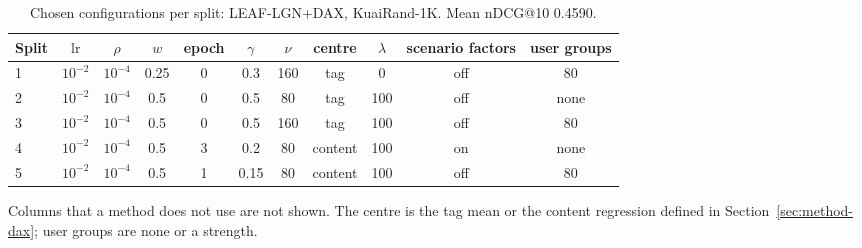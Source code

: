 \begin{table}[tbp]
\centering
\footnotesize
\caption{Chosen configurations per split: LEAF-LGN+DAX, KuaiRand-1K. Mean nDCG@10 0.4590.}
\label{tab:grid12}
\begin{adjustbox}{max width=\linewidth}
\begin{tabular}{lcccccccccc}
\toprule
Split & $\mathrm{lr}$ & $\rho$ & $w$ & epoch & $\gamma$ & $\nu$ & centre & $\lambda$ & scenario factors & user groups \\
\midrule
1 & $10^{-2}$ & $10^{-4}$ & 0.25 & 0 & 0.3 & 160 & tag & 0 & off & 80 \\
2 & $10^{-2}$ & $10^{-4}$ & 0.5 & 0 & 0.5 & 80 & tag & 100 & off & none \\
3 & $10^{-2}$ & $10^{-4}$ & 0.5 & 0 & 0.5 & 160 & tag & 100 & off & 80 \\
4 & $10^{-2}$ & $10^{-4}$ & 0.5 & 3 & 0.2 & 80 & content & 100 & on & none \\
5 & $10^{-2}$ & $10^{-4}$ & 0.5 & 1 & 0.15 & 80 & content & 100 & off & 80 \\
\bottomrule
\end{tabular}
\end{adjustbox}
\par\smallskip
\begin{minipage}{\linewidth}\raggedright\footnotesize Columns that a method does not use are not shown. The centre is the tag mean or the content regression defined in Section~\ref{sec:method-dax}; user groups are none or a strength.\end{minipage}
\end{table}
